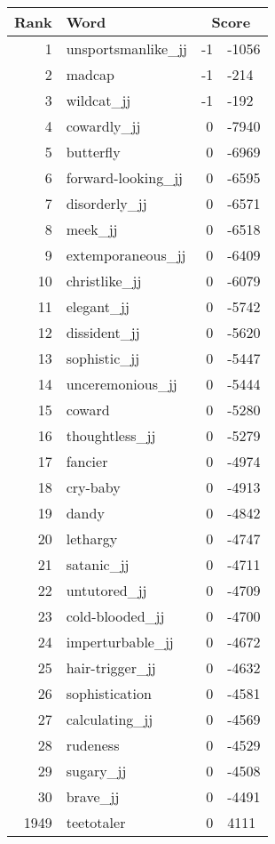 \begin{longtable}[!htbp]{| rlr@{.}l |}
    \hline
    \textbf{Rank} & \textbf{Word} & \multicolumn{2}{c|}{\textbf{Score}} \\
    \hline
    \endhead
    1 & unsportsmanlike\_jj & -1 & -1056 \\
    2 & madcap & -1 & -214 \\
    3 & wildcat\_jj & -1 & -192 \\
    4 & cowardly\_jj & 0 & -7940 \\
    5 & butterfly & 0 & -6969 \\
    6 & forward-looking\_jj & 0 & -6595 \\
    7 & disorderly\_jj & 0 & -6571 \\
    8 & meek\_jj & 0 & -6518 \\
    9 & extemporaneous\_jj & 0 & -6409 \\
    10 & christlike\_jj & 0 & -6079 \\
    11 & elegant\_jj & 0 & -5742 \\
    12 & dissident\_jj & 0 & -5620 \\
    13 & sophistic\_jj & 0 & -5447 \\
    14 & unceremonious\_jj & 0 & -5444 \\
    15 & coward & 0 & -5280 \\
    16 & thoughtless\_jj & 0 & -5279 \\
    17 & fancier & 0 & -4974 \\
    18 & cry-baby & 0 & -4913 \\
    19 & dandy & 0 & -4842 \\
    20 & lethargy & 0 & -4747 \\
    21 & satanic\_jj & 0 & -4711 \\
    22 & untutored\_jj & 0 & -4709 \\
    23 & cold-blooded\_jj & 0 & -4700 \\
    24 & imperturbable\_jj & 0 & -4672 \\
    25 & hair-trigger\_jj & 0 & -4632 \\
    26 & sophistication & 0 & -4581 \\
    27 & calculating\_jj & 0 & -4569 \\
    28 & rudeness & 0 & -4529 \\
    29 & sugary\_jj & 0 & -4508 \\
    30 & brave\_jj & 0 & -4491 \\
    1949 & teetotaler & 0 & 4111 \\

\end{longtable}
